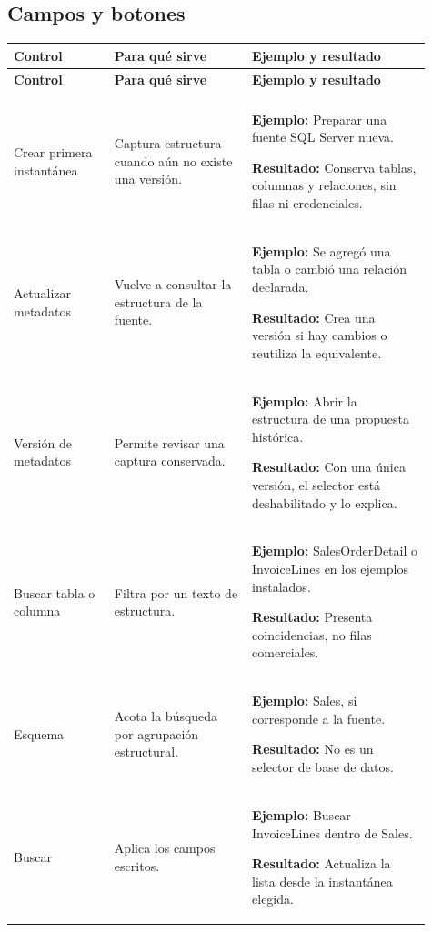 \subsection{Campos y botones}
\begingroup
\fontsize{10}{12.5}\selectfont
\setlength{\tabcolsep}{5pt}
\renewcommand{\arraystretch}{1.15}
\begin{longtable}{@{}>{\RaggedRight\arraybackslash}p{0.22\linewidth}>{\RaggedRight\arraybackslash}p{0.3\linewidth}>{\RaggedRight\arraybackslash}p{0.39\linewidth}@{}}
\toprule
\textbf{Control} & \textbf{Para qué sirve} & \textbf{Ejemplo y resultado} \\
\midrule
\endfirsthead
\toprule
\textbf{Control} & \textbf{Para qué sirve} & \textbf{Ejemplo y resultado} \\
\midrule
\endhead
\midrule
\multicolumn{3}{r}{\footnotesize Continúa en la página siguiente}\\
\endfoot
\bottomrule
\endlastfoot
Crear primera instantánea & Captura estructura cuando aún no existe una versión. & \textbf{Ejemplo:} Preparar una fuente SQL Server nueva.\par\smallskip\textbf{Resultado:} Conserva tablas, columnas y relaciones, sin filas ni credenciales. \\
\addlinespace[3pt]
Actualizar metadatos & Vuelve a consultar la estructura de la fuente. & \textbf{Ejemplo:} Se agregó una tabla o cambió una relación declarada.\par\smallskip\textbf{Resultado:} Crea una versión si hay cambios o reutiliza la equivalente. \\
\addlinespace[3pt]
Versión de metadatos & Permite revisar una captura conservada. & \textbf{Ejemplo:} Abrir la estructura de una propuesta histórica.\par\smallskip\textbf{Resultado:} Con una única versión, el selector está deshabilitado y lo explica. \\
\addlinespace[3pt]
Buscar tabla o columna & Filtra por un texto de estructura. & \textbf{Ejemplo:} SalesOrderDetail o InvoiceLines en los ejemplos instalados.\par\smallskip\textbf{Resultado:} Presenta coincidencias, no filas comerciales. \\
\addlinespace[3pt]
Esquema & Acota la búsqueda por agrupación estructural. & \textbf{Ejemplo:} Sales, si corresponde a la fuente.\par\smallskip\textbf{Resultado:} No es un selector de base de datos. \\
\addlinespace[3pt]
Buscar & Aplica los campos escritos. & \textbf{Ejemplo:} Buscar InvoiceLines dentro de Sales.\par\smallskip\textbf{Resultado:} Actualiza la lista desde la instantánea elegida. \\

\end{longtable}

